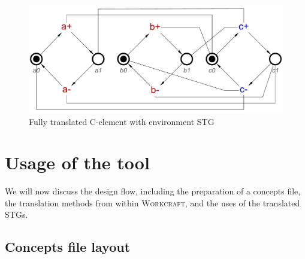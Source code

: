 \documentclass[british, 10pt, conference, compsocconf]{IEEEtran}
\newcommand{\noun}[1]{\textsc{#1}}
\begin{document}
\begin{figure}[H]
\vspace{-4mm}
\begin{centering}
\includegraphics[scale=0.3]{Images/cElement-stg-translated}
\par\end{centering}
\protect\caption{\label{fig:cElement-stg-translated} Fully translated C-element with environment STG}
\vspace{-3mm}
\end{figure}


\section{Usage of the tool\label{sec:tool-use}}

\vspace{-1mm}

We will now discuss the design flow, including the preparation of 
a concepts file, the translation methods from within \noun{Workcraft}, and 
the uses of the translated STGs.

\vspace{-1mm}

\subsection{Concepts file layout \label{sub:file_layout}}

\vspace{-2mm}
\end{document}
